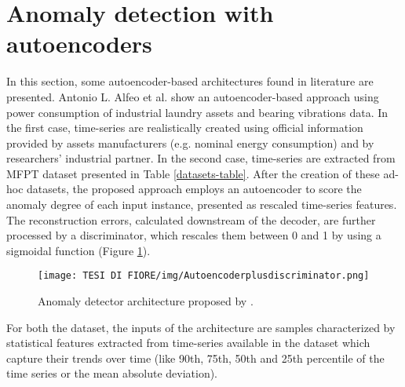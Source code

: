\section{Anomaly detection with autoencoders}
In this section, some autoencoder-based architectures found in literature are presented.
Antonio L. Alfeo et al. \cite{12UsingAEinManufacturing} show an autoencoder-based approach using power consumption of industrial laundry assets and bearing vibrations data. In the first case, time-series are realistically created using official information provided by assets manufacturers (e.g. nominal energy consumption) and by researchers' industrial partner. In the second case, time-series are extracted from MFPT dataset presented in Table \ref{datasets-table}. After the creation of these ad-hoc datasets, the proposed approach employs an autoencoder to score the anomaly degree of each input instance, presented as rescaled time-series features. The reconstruction errors, calculated downstream of the decoder, are further processed by a discriminator, which rescales them between 0 and 1 by using a sigmoidal function (Figure \ref{autoencoder_plus_discriminator}).
\begin{figure}[ht]
\texttt{[image: TESI DI FIORE/img/Autoencoderplusdiscriminator.png]}
\centering
\caption{Anomaly detector architecture proposed by \cite{12UsingAEinManufacturing}.}
\label{autoencoder_plus_discriminator}
\end{figure}
For both the dataset, the inputs of the architecture are samples characterized by statistical features extracted from time-series available in the dataset which capture their trends over time (like 90th, 75th, 50th and 25th percentile of the time series or the mean absolute deviation).\\
